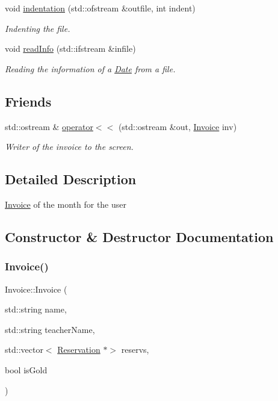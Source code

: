 \begin{DoxyCompactItemize}
$$void \mbox{\hyperlink{class_invoice_a08ce5090cf11e9f74820810d3796dea2}{indentation}} (std\+::ofstream \&outfile, int indent)
\begin{DoxyCompactList}\small\item\em Indenting the file. \end{DoxyCompactList}\item 
void \mbox{\hyperlink{class_invoice_aae19e485510f08c56be425b4634246ed}{read\+Info}} (std\+::ifstream \&infile)
\begin{DoxyCompactList}\small\item\em Reading the information of a \mbox{\hyperlink{class_date}{Date}} from a file. \end{DoxyCompactList}\end{DoxyCompactItemize}
\subsection*{Friends}
\begin{DoxyCompactItemize}
\item 
std\+::ostream \& \mbox{\hyperlink{class_invoice_a1ff3da2cc7abd9df37b2936772ce9ff7}{operator$<$$<$}} (std\+::ostream \&out, \mbox{\hyperlink{class_invoice}{Invoice}} inv)
\begin{DoxyCompactList}\small\item\em Writer of the invoice to the screen. \end{DoxyCompactList}\end{DoxyCompactItemize}


\subsection{Detailed Description}
\mbox{\hyperlink{class_invoice}{Invoice}} of the month for the user 

\subsection{Constructor \& Destructor Documentation}
\mbox{\label{class_invoice_a6db408ae47f1a40911c51b769b428034}} 
\subsubsection{\texorpdfstring{Invoice()}{Invoice()}}
{\footnotesize\ttfamily Invoice\+::\+Invoice (\begin{DoxyParamCaption}\item[{std\+::string}]{name,  }\item[{std\+::string}]{teacher\+Name,  }\item[{std\+::vector$<$ \mbox{\hyperlink{class_reservation}{Reservation}} $\ast$$>$}]{reservs,  }\item[{bool}]{is\+Gold }\end{DoxyParamCaption})}



